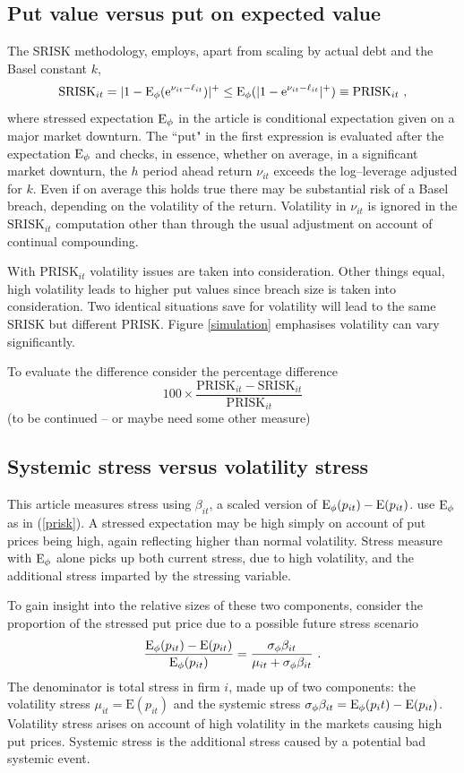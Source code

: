 \documentclass[authoryear]{elsarticle}
\newcommand{\E}{\mathrm{E}}
\newcommand{\e}{\mathrm{e}}
\newcommand{\eref}[1]{(\ref{#1})}
\newcommand{\fref}[1]{Figure \ref{#1}}
\newcommand{\be}[1]{\begin{equation}\label{#1}}
\newcommand{\ee}{\end{equation}}
\begin{document}
\subsection{Put value versus put on expected value} 

The SRISK methodology, employs, apart from scaling by actual debt and the Basel constant $k$,
\be{prisk}
\mathrm{SRISK}_{it} = |1-\E_\phi(\e^{\nu_{it}-\ell_{it}})|^+\le \Es(|1-\e^{\nu_{it}-\ell_{it}}|^+) \equiv \mathrm{PRISK}_{it}\ , 
\ee
where stressed expectation $\Es$ in the \cite{brownlees2015} article is conditional expectation given on a major market downturn.  The   ``put" in the first expression is evaluated after the expectation $\Es$ and checks, in essence, whether on average, in a significant market downturn, the $h$ period ahead return $\nu_{it}$ exceeds the   log--leverage adjusted for $k$.  Even if on average this holds true there may be substantial risk of a Basel breach, depending on the volatility of the return.   Volatility in $\nu_{it}$ is ignored in the $\mathrm{SRISK}_{it}$ computation other than through the usual adjustment on account of continual compounding.

With $\mathrm{PRISK}_{it}$ volatility issues are taken into consideration.  Other things equal, high volatility leads to higher put values since breach size  is taken into consideration.   Two identical situations save for volatility will lead to the same SRISK but different PRISK.  \fref{simulation} emphasises volatility  can vary significantly.

To evaluate the difference consider the percentage difference
$$
100\times \frac{\mathrm{PRISK}_{it}-\mathrm{SRISK}_{it}}{\mathrm{PRISK}_{it}}
$$
(to be continued -- or maybe need some other measure)

\subsection{Systemic stress versus volatility stress}

This article measures stress using $\beta_{it}$, a scaled version of $\Es(p_{it})-\E(p_{it})$.   \cite{brownlees2015} use $\Es$ as in \eref{prisk}.  A stressed expectation may be high simply on account of put prices being high, again reflecting higher than normal volatility.
Stress measure with $\Es$ alone picks up both current stress, due to high volatility, and the additional stress imparted by the stressing variable.

To gain insight into the relative sizes of these two components, consider the proportion of the stressed put price due to a possible future stress scenario
$$
\frac{\Es(p_{it})-\E(p_{it})}{\Es(p_{it})} = \frac{\sigma_\phi\beta_{it}}{\mu_{it}+\sigma_\phi\beta_{it}}  \ . 
$$
The denominator is total stress in firm $i$, made up of two components:   the volatility stress $\mu_{it}=\E(p_{it})$ and the systemic stress $\sigma_\phi\beta_{it}=\Es(p_it)-\E(p_{it})$.   Volatility stress  arises on account  of high volatility in the markets causing high put prices.   Systemic stress is the additional stress caused by  a potential  bad systemic event.     
\end{document}
